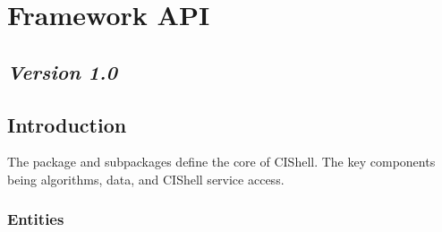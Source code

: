 \chapter{Framework API}

\section*{\textit{Version 1.0}}

\section{Introduction}

The  package and subpackages define the core of
CIShell. The key components being algorithms, data, and CIShell service access.

\subsection{Entities}


